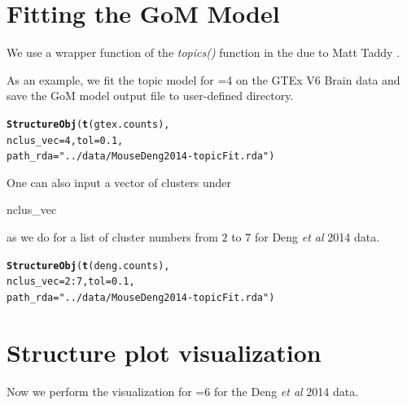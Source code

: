 \documentclass[12pt]{article}\usepackage[]{graphicx}\usepackage[usenames,dvipsnames]{color}
\makeatletter
\newcommand{\hlnum}[1]{\textcolor[rgb]{0.686,0.059,0.569}{#1}}%
\newcommand{\hlstr}[1]{\textcolor[rgb]{0.192,0.494,0.8}{#1}}%
\newcommand{\hlopt}[1]{\textcolor[rgb]{0,0,0}{#1}}%
\newcommand{\hlstd}[1]{\textcolor[rgb]{0.345,0.345,0.345}{#1}}%
\newcommand{\hlkwc}[1]{\textcolor[rgb]{0.333,0.667,0.333}{#1}}%
\newcommand{\hlkwd}[1]{\textcolor[rgb]{0.737,0.353,0.396}{\textbf{#1}}}%
\newenvironment{kframe}{%
 \def\at@end@of@kframe{}%
 \ifinner\ifhmode%
  \def\at@end@of@kframe{\end{minipage}}%
  \begin{minipage}{\columnwidth}%
 \fi\fi%
 \def\FrameCommand##1{\hskip\@totalleftmargin \hskip-\fboxsep
 \colorbox{shadecolor}{##1}\hskip-\fboxsep
     \hskip-\linewidth \hskip-\@totalleftmargin \hskip\columnwidth}%
 \MakeFramed {\advance\hsize-\width
   \@totalleftmargin\z@ \linewidth\hsize
   \@setminipage}}%
 {\par\unskip\endMakeFramed%
 \at@end@of@kframe}
\newenvironment{knitrout}{}{} %
\makeatother
\begin{document}
\section{Fitting the GoM Model}

We use a wrapper function of the \textit{topics()} function in the  due to Matt Taddy \cite{Taddy2012}.

As an example, we fit the topic model for =4 on the GTEx V6 Brain data and save the GoM model output file to user-defined directory.

\begin{knitrout}
\color{fgcolor}\begin{kframe}
\begin{alltt}
\hlkwd{StructureObj}\hlstd{(}\hlkwd{t}\hlstd{(gtex.counts),}
            \hlkwc{nclus_vec}\hlstd{=}\hlnum{4}\hlstd{,} \hlkwc{tol}\hlstd{=}\hlnum{0.1}\hlstd{,}
             \hlkwc{path_rda}\hlstd{=}\hlstr{"../data/MouseDeng2014-topicFit.rda"}\hlstd{)}
\end{alltt}
\end{kframe}
\end{knitrout}

One can also input a vector of clusters under \begin{verb} nclus_vec \end{verb} as we do for a list of cluster numbers from $2$ to $7$ for Deng \textit{et al} 2014 data.

\begin{knitrout}
\color{fgcolor}\begin{kframe}
\begin{alltt}
\hlkwd{StructureObj}\hlstd{(}\hlkwd{t}\hlstd{(deng.counts),}
            \hlkwc{nclus_vec}\hlstd{=}\hlnum{2}\hlopt{:}\hlnum{7}\hlstd{,} \hlkwc{tol}\hlstd{=}\hlnum{0.1}\hlstd{,}
             \hlkwc{path_rda}\hlstd{=}\hlstr{"../data/MouseDeng2014-topicFit.rda"}\hlstd{)}
\end{alltt}
\end{kframe}
\end{knitrout}



\section{Structure plot visualization}

Now we perform the visualization for =6 for the Deng \textit{et al} 2014 data.
\end{document}
